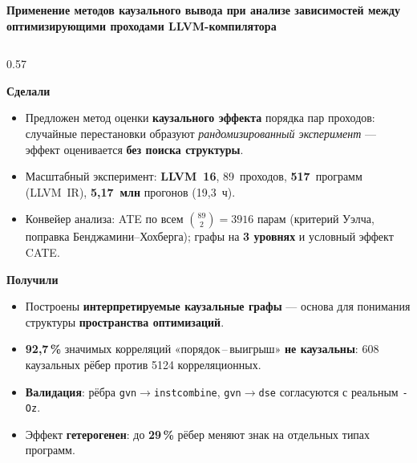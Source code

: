 \documentclass[aspectratio=169]{beamer}
\newcommand{\heading}[1]{{\color{slideblue}\bfseries #1}\par\nobreak\smallskip}
\begin{document}
\begin{frame}[plain]
  \vspace{2pt}
  {\color{titlered}\bfseries\small Применение методов каузального вывода при анализе
    зависимостей между оптимизирующими проходами LLVM-компилятора}

  \vspace{2pt}

  \scriptsize
  \begin{columns}[T]
  \begin{column}{0.57\textwidth}

    \heading{Сделали}
    \begin{itemize}\itemsep1pt
      \item Предложен метод оценки \textbf{каузального эффекта} порядка пар
        проходов: случайные перестановки образуют \emph{рандомизированный
        эксперимент} --- эффект оценивается \textbf{без поиска структуры}.
      \item Масштабный эксперимент: \textbf{LLVM~16}, 89~проходов,
        \textbf{517}~программ (LLVM~IR), \textbf{5,17~млн} прогонов (19,3~ч).
      \item Конвейер анализа: ATE по всем $\binom{89}{2}{=}3916$ парам (критерий
        Уэлча, поправка Бенджамини--Хохберга); графы на \textbf{3 уровнях} и
        условный эффект CATE.
    \end{itemize}

    \vspace{1pt}
    \heading{Получили}
    \begin{itemize}\itemsep1pt
      \item Построены \textbf{интерпретируемые каузальные графы} --- основа
        для понимания структуры \textbf{пространства оптимизаций}.
      \item {\color{titlered}\textbf{92,7\,\%}} значимых корреляций
        «порядок\,--\,выигрыш» \textbf{не каузальны}: 608 каузальных рёбер
        против 5124 корреляционных.
      \item \textbf{Валидация}: рёбра \texttt{gvn}$\to$\texttt{instcombine},
        \texttt{gvn}$\to$\texttt{dse} согласуются с реальным \texttt{-Oz}.
      \item Эффект \textbf{гетерогенен}: до \textbf{29\,\%} рёбер меняют знак
        на отдельных типах программ.
    \end{itemize}


\end{column}
\end{columns}
\end{frame}
\end{document}
